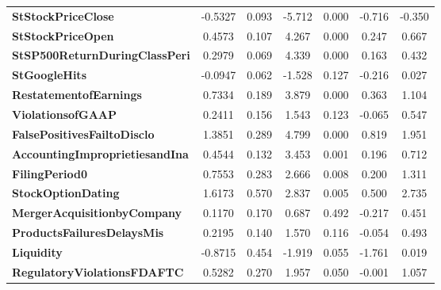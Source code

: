 \begin{table}[H]
\begin{center}
\begin{tabular}{lcccccc}
\textbf{StStockPriceClose}             &      -0.5327  &        0.093     &    -5.712  &         0.000        &       -0.716    &       -0.350     \\
\textbf{StStockPriceOpen}              &       0.4573  &        0.107     &     4.267  &         0.000        &        0.247    &        0.667     \\
\textbf{StSP500ReturnDuringClassPeri}  &       0.2979  &        0.069     &     4.339  &         0.000        &        0.163    &        0.432     \\
\textbf{StGoogleHits}                  &      -0.0947  &        0.062     &    -1.528  &         0.127        &       -0.216    &        0.027     \\
\textbf{RestatementofEarnings}         &       0.7334  &        0.189     &     3.879  &         0.000        &        0.363    &        1.104     \\
\textbf{ViolationsofGAAP}              &       0.2411  &        0.156     &     1.543  &         0.123        &       -0.065    &        0.547     \\
\textbf{FalsePositivesFailtoDisclo}    &       1.3851  &        0.289     &     4.799  &         0.000        &        0.819    &        1.951     \\
\textbf{AccountingImproprietiesandIna} &       0.4544  &        0.132     &     3.453  &         0.001        &        0.196    &        0.712     \\
\textbf{FilingPeriod0}                 &       0.7553  &        0.283     &     2.666  &         0.008        &        0.200    &        1.311     \\
\textbf{StockOptionDating}             &       1.6173  &        0.570     &     2.837  &         0.005        &        0.500    &        2.735     \\
\textbf{MergerAcquisitionbyCompany}    &       0.1170  &        0.170     &     0.687  &         0.492        &       -0.217    &        0.451     \\
\textbf{ProductsFailuresDelaysMis}     &       0.2195  &        0.140     &     1.570  &         0.116        &       -0.054    &        0.493     \\
\textbf{Liquidity}                     &      -0.8715  &        0.454     &    -1.919  &         0.055        &       -1.761    &        0.019     \\
\textbf{RegulatoryViolationsFDAFTC}    &       0.5282  &        0.270     &     1.957  &         0.050        &       -0.001    &        1.057     \\

\end{tabular}
\end{center}
\end{table}
